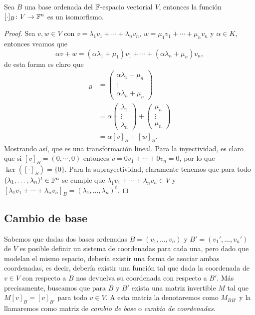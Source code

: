 \begin{prop}
  Sea $B$ una base ordenada del $\mathbb{F}$-espacio vectorial $V$, entonces la función $[\cdot]_B\colon V \to \mathbb{F}^n$ es un isomorfismo.
\end{prop}
\begin{proof}
  Sea $v,w \in V$ con $v = \lambda_1 v_1 + \cdots + \lambda_n v_n$, $w = \mu_1 v_1 + \cdots + \mu_n v_n$ y $\alpha \in K$, entonces veamos que
  \[
  \alpha v+w =  (\alpha\lambda_1+\mu_1) v_1 + \cdots + (\alpha\lambda_n+\mu_n) v_n,
  \]
  de esta forma es claro que
  \begin{align*}
    [v+w]_B 
      &= \begin{pmatrix} \alpha\lambda_1+\mu_n \\ \vdots \\ \alpha\lambda_n+\mu_n \end{pmatrix} \\
      &= \alpha\begin{pmatrix} \lambda_1 \\ \vdots \\ \lambda_n \end{pmatrix}
       + \begin{pmatrix} \mu_n \\ \vdots \\ \mu_n  \end{pmatrix} \\
      &= \alpha[v]_B + [w]_B.
  \end{align*}
  Mostrando así, que es una transformación lineal. Para la inyectividad, es claro que si $[v]_B = (0,\cdots,0)$ entonces $v = 0v_1 + \cdots + 0v_n = 0$, por lo que $\ker([\cdot]_B) = \{0\}$. Para la suprayectividad, claramente tenemos que para todo $(\lambda_1, \ldots, \lambda_n)^t \in \mathbb{F}^n$ se cumple que $\lambda_1 v_1 + \cdots + \lambda_n v_n \in V$ y  $[\lambda_1 v_1 + \cdots  + \lambda_n v_n]_B = (\lambda_1, \ldots, \lambda_n)^t$.
\end{proof}


\subsection{Cambio de base}

Sabemos que dadas dos bases ordenadas $B = (v_1,\ldots,v_n)$ y $B' = (v_1',\ldots,v_n')$ de $V$ es posible definir un sistema de coordenadas para cada una, pero dado que modelan el mismo espacio, debería existir una forma de asociar ambas coordenadas, es decir, debería existir una función tal que dada la coordenada de $v \in V$ con respecto a $B$ nos devuelva su coordenada con respecto a $B'$. Más precisamente, buscamos que para $B$ y $B'$ exista una matriz invertible $M$ tal que $M [v]_B = [v]_{B'}$ para todo $v \in V$. A esta matriz la denotaremos como $M_{BB'}$ y la llamaremos como matriz de \emph{cambio de base} o \emph{cambio de coordenadas}.

